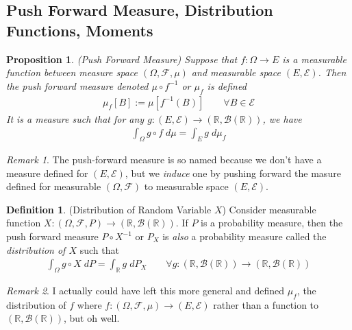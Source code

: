 \documentclass[12pt]{article}
\theoremstyle{plain}
\newtheorem{prop}[thm]{Proposition}
\theoremstyle{definition}
\newtheorem{defn}[thm]{Definition}
\theoremstyle{remark}
\newtheorem*{rmk}{Remark}
\newcommand{\ra}{\rightarrow}
\newcommand{\sE}{\mathscr{E}}
\newcommand{\sF}{\mathscr{F}}
\newcommand{\sB}{\mathscr{B}}
\newcommand{\R}{\mathbb{R}}
\begin{document}
\clearpage
\subsection{Push Forward Measure, Distribution Functions, Moments}

\begin{prop}\emph{(Push Forward Measure)}
Suppose that $f:\Omega\ra E$ is a measurable function between measure
space $(\Omega,\sF,\mu)$ and measurable space $(E,\sE)$. Then the push
forward measure denoted $\mu \circ f^{-1}$ or $\mu_f$ is
defined
\begin{align*}
  \mu_f[B] := \mu[f^{-1}(B)]
  \qquad\forall B \in\sE
\end{align*}
It is a measure such that for any $g:(E,\sE)\ra(\R,\sB(\R))$, we have
\begin{align*}
  \int_\Omega g\circ f \; d\mu
  =
  \int_E g\;d\mu_f
\end{align*}
\end{prop}
\begin{rmk}
The push-forward measure is so named because we don't have a measure
defined for $(E,\sE)$, but we \emph{induce} one by pushing forward the
masure defined for measurable $(\Omega,\sF)$ to measurable space
$(E,\sE)$.
\end{rmk}

\begin{defn}(Distribution of Random Variable $X$)
Consider measurable function $X:(\Omega,\sF,P)\ra (\R,\sB(\R))$.
If $P$ is a probability measure, then the push forward
measure $P \circ X^{-1}$ or $P_X$ is \emph{also} a probability measure
called the \emph{distribution of $X$} such that
\begin{align*}
  \int_\Omega g\circ X\; dP
  = \int_\R g \; dP_X
  \qquad \forall g:(\R,\sB(\R))\ra (\R,\sB(\R))
\end{align*}
\end{defn}
\begin{rmk}
I actually could have left this more general and defined $\mu_f$, the
distribution of $f$ where $f:(\Omega,\sF,\mu)\ra (E,\sE)$ rather than a
function to $(\R,\sB(\R))$, but oh well.
\end{rmk}
\end{document}
